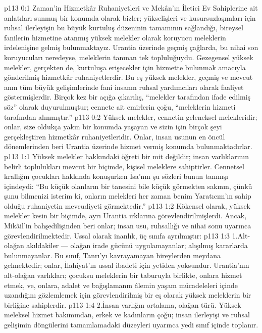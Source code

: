 \vs p113 0:1 Zaman’in Hizmetkâr Ruhaniyetleri ve Mekân’ın İletici Ev Sahiplerine ait anlatıları sunmuş bir konumda olarak bizler; yükselişleri ve kusursuzlaşımları için ruhsal ilerleyişin bu büyük kurtuluş düzeninin tamamının sağlandığı, bireysel fanilerin hizmetine atanmış yüksek melekler olarak koruyucu meleklerin irdelenişine gelmiş bulunmaktayız. Urantia üzerinde geçmiş çağlarda, bu nihai son koruyucuları neredeyse, meleklerin tanınan tek topluluğuydu. Gezegensel yüksek melekler, gerçekten de, kurtuluşa erişecekler için hizmette bulunmak amacıyla gönderilmiş hizmetkâr ruhaniyetlerdir. Bu eş yüksek melekler, geçmiş ve mevcut anın tüm büyük gelişimlerinde fani insanın ruhsal yardımcıları olarak faaliyet göstermişlerdir. Birçok kez bir açığa çıkarılış, “melekler tarafından ifade edilmiş söz” olarak duyurulmuştur; cennete ait emirlerin çoğu, “meleklerin hizmeti tarafından alınmıştır.”
\vs p113 0:2 Yüksek melekler, cennetin geleneksel melekleridir; onlar, size oldukça yakın bir konumda yaşayan ve sizin için birçok şeyi gerçekleştiren hizmetkâr ruhaniyetleridir. Onlar, insan usunun en öncül dönemlerinden beri Urantia üzerinde hizmet vermiş konumda bulunmaktadırlar.
\vs p113 1:1 Yüksek melekler hakkındaki öğreti bir mit değildir; insan varlıklarının belirli toplulukları mevcut bir biçimde, kişisel meleklere sahiptirler. Cennetsel krallığın çocukları hakkında konuşurken İsa’nın şu sözleri bunun tanınışı içindeydi: “Bu küçük olanların bir tanesini bile küçük görmekten sakının, çünkü şunu bilmenizi isterim ki, onların melekleri her zaman benim Yaratıcım’ın sahip olduğu ruhaniyetin mevcudiyeti görmektedir.”
\vs p113 1:2 Kökensel olarak, yüksek melekler kesin bir biçimde, ayrı Urantia ırklarına görevlendirilmişlerdi. Ancak, Mikâil’in bahşedilişinden beri onlar; insan usu, ruhsallığı ve nihai sonu uyarınca görevlendirilmektedir. Ussal olarak inanlık, üç sınıfa ayrılmıştır:
\vs p113 1:3 1.\bibnobreakspace Alt\hyp{}olağan akıldakiler --- olağan irade gücünü uygulamayanlar; alışılmış kararlarda bulunmayanlar. Bu sınıf, Tanrı’yı kavrayamayan bireylerden meydana gelmektedir; onlar, İlahiyat’ın ussal ibadeti için yetiden yoksundur. Urantia’nın alt\hyp{}olağan varlıkları; çocuksu meleklerin bir taburuyla birlikte, onlara hizmet etmek, ve, onlara, adalet ve bağışlamanın âlemin yaşam mücadeleleri içinde uzandığını gözlemlemek için görevlendirilmiş bir eş olarak yüksek meleklerin bir birliğine sahiplerdir.
\vs p113 1:4 2.\bibnobreakspace İnsan varlığın ortalama, olağan türü. Yüksek meleksel hizmet bakımından, erkek ve kadınların çoğu; insan ilerleyişi ve ruhsal gelişimin döngülerini tamamlamadaki düzeyleri uyarınca yedi sınıf içinde toplanır.
